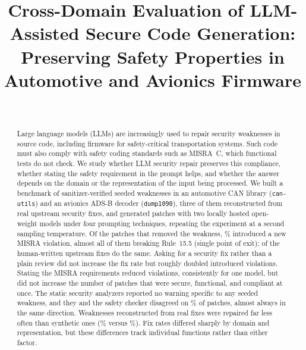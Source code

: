 \documentclass[12pt]{IEEEtran}
\begin{document}
\title{Cross-Domain Evaluation of LLM-Assisted Secure Code Generation: Preserving Safety Properties in Automotive and Avionics Firmware}

\author{
\\
%
}
\maketitle

\begin{abstract}
Large language models (LLMs) are increasingly used to repair security weaknesses in source code, including firmware for safety-critical transportation systems. Such code must also comply with safety coding standards such as MISRA~C, which functional tests do not check. We study whether LLM security repair preserves this compliance, whether stating the safety requirement in the prompt helps, and whether the answer depends on the domain or the representation of the input being processed. We built a benchmark of  sanitizer-verified seeded weaknesses in an automotive CAN library (\texttt{can-utils}) and an avionics ADS-B decoder (\texttt{dump1090}), three of them reconstructed from real upstream security fixes, and generated  patches with two locally hosted open-weight models under four prompting techniques, repeating the experiment at a second sampling temperature. Of the  patches that removed the weakness, \% introduced a new MISRA violation, almost all of them breaking Rule~15.5 (single point of exit);  of the  human-written upstream fixes do the same. Asking for a security fix rather than a plain review did not increase the fix rate but roughly doubled introduced violations. Stating the MISRA requirements reduced violations, consistently for one model, but did not increase the number of patches that were secure, functional, and compliant at once. The static security analyzers reported no warning specific to any seeded weakness, and they and the safety checker disagreed on \% of patches, almost always in the same direction. Weaknesses reconstructed from real fixes were repaired far less often than synthetic ones (\% versus \%). Fix rates differed sharply by domain and representation, but these differences track individual functions rather than either factor.
\end{abstract}
\end{document}
